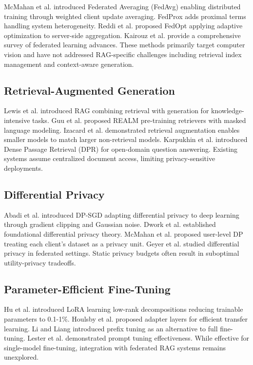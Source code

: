 \documentclass[conference]{IEEEtran}
\begin{document}
McMahan et al. \cite{mcmahan2017communication} introduced Federated Averaging (FedAvg) enabling distributed training through weighted client update averaging. FedProx \cite{li2020federated} adds proximal terms handling system heterogeneity. Reddi et al. \cite{reddi2020adaptive} proposed FedOpt applying adaptive optimization to server-side aggregation. Kairouz et al. \cite{kairouz2021advances} provide a comprehensive survey of federated learning advances. These methods primarily target computer vision and have not addressed RAG-specific challenges including retrieval index management and context-aware generation.

\subsection{Retrieval-Augmented Generation}

Lewis et al. \cite{lewis2020retrieval} introduced RAG combining retrieval with generation for knowledge-intensive tasks. Guu et al. \cite{guu2020retrieval} proposed REALM pre-training retrievers with masked language modeling. Izacard et al. \cite{izacard2022atlas} demonstrated retrieval augmentation enables smaller models to match larger non-retrieval models. Karpukhin et al. \cite{karpukhin2020dense} introduced Dense Passage Retrieval (DPR) for open-domain question answering. Existing systems assume centralized document access, limiting privacy-sensitive deployments.

\subsection{Differential Privacy}

Abadi et al. \cite{abadi2016deep} introduced DP-SGD adapting differential privacy to deep learning through gradient clipping and Gaussian noise. Dwork et al. \cite{dwork2014algorithmic} established foundational differential privacy theory. McMahan et al. \cite{mcmahan2017learning} proposed user-level DP treating each client's dataset as a privacy unit. Geyer et al. \cite{geyer2017differentially} studied differential privacy in federated settings. Static privacy budgets often result in suboptimal utility-privacy tradeoffs.

\subsection{Parameter-Efficient Fine-Tuning}

Hu et al. \cite{hu2021lora} introduced LoRA learning low-rank decompositions reducing trainable parameters to 0.1-1\%. Houlsby et al. \cite{houlsby2019parameter} proposed adapter layers for efficient transfer learning. Li and Liang \cite{li2021prefix} introduced prefix tuning as an alternative to full fine-tuning. Lester et al. \cite{lester2021power} demonstrated prompt tuning effectiveness. While effective for single-model fine-tuning, integration with federated RAG systems remains unexplored.
\end{document}
